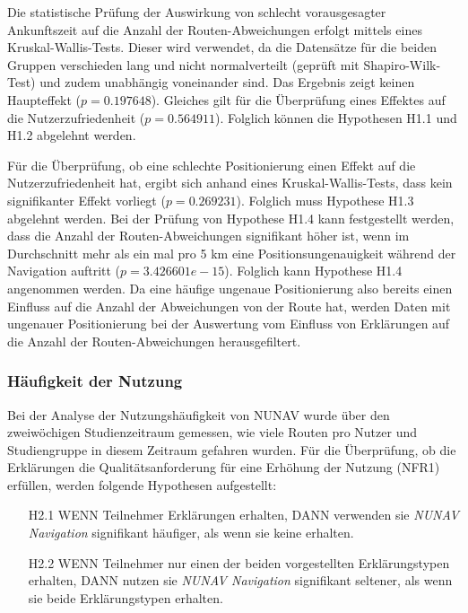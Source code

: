 Die statistische Prüfung der Auswirkung von schlecht vorausgesagter Ankunftszeit auf die Anzahl der Routen-Abweichungen erfolgt mittels eines Kruskal-Wallis-Tests. Dieser wird verwendet, da die Datensätze für die beiden Gruppen verschieden lang und nicht normalverteilt (geprüft mit Shapiro-Wilk-Test) und zudem unabhängig voneinander sind. Das Ergebnis zeigt keinen Haupteffekt ($ p = 0.197648 $). Gleiches gilt für die Überprüfung eines Effektes auf die Nutzerzufriedenheit ($ p = 0.564911 $). Folglich können die Hypothesen H1.1 und H1.2 abgelehnt werden.

Für die Überprüfung, ob eine schlechte Positionierung einen Effekt auf die Nutzerzufriedenheit hat, ergibt sich anhand eines Kruskal-Wallis-Tests, dass kein signifikanter Effekt vorliegt ($ p = 0.269231 $). Folglich muss Hypothese H1.3 abgelehnt werden. Bei der Prüfung von Hypothese H1.4 kann festgestellt werden, dass die Anzahl der Routen-Abweichungen signifikant höher ist, wenn im Durchschnitt mehr als ein mal pro 5 km eine Positionsungenauigkeit während der Navigation auftritt ($ p = 3.426601e-15 $). Folglich kann Hypothese H1.4 angenommen werden. Da eine häufige ungenaue Positionierung also bereits einen Einfluss auf die Anzahl der Abweichungen von der Route hat, werden Daten mit ungenauer Positionierung bei der Auswertung vom Einfluss von Erklärungen auf die Anzahl der Routen-Abweichungen herausgefiltert.

\subsubsection{Häufigkeit der Nutzung}
\label{sec:06_model_evaluation:usage_analysis}

Bei der Analyse der Nutzungshäufigkeit von NUNAV wurde über den zweiwöchigen Studienzeitraum gemessen, wie viele Routen pro Nutzer und Studiengruppe in diesem Zeitraum gefahren wurden. Für die Überprüfung, ob die Erklärungen die Qualitätsanforderung für eine Erhöhung der Nutzung (NFR1) erfüllen, werden folgende Hypothesen aufgestellt:

\begin{enumerate}
    \item[H2.1] WENN Teilnehmer Erklärungen erhalten, DANN verwenden sie \textit{NUNAV Navigation} signifikant häufiger, als wenn sie keine erhalten.
    \item[H2.2] WENN Teilnehmer nur einen der beiden vorgestellten Erklärungstypen erhalten, DANN nutzen sie \textit{NUNAV Navigation} signifikant seltener, als wenn sie beide Erklärungstypen erhalten.
\end{enumerate}

